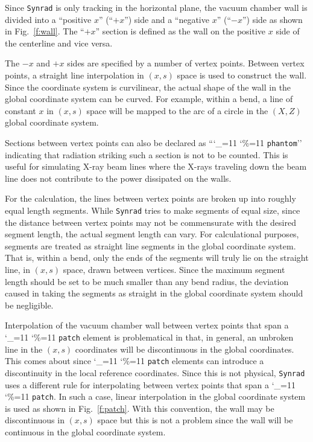 \documentclass[11pt]{article}
\newcommand{\syn}{\texttt{Synrad}\xspace}
\newcommand\ttcmd{\begingroup\catcode`\_=11 \catcode`\%=11 \dottcmd}
\newcommand\dottcmd[1]{\texttt{#1}\endgroup}
\newcommand{\vn}{\ttcmd}
\begin{document}
Since \syn is only tracking in the horizontal plane, the vacuum
chamber wall is divided into a ``positive $x$'' (``$+x$'') side and a
``negative $x$'' (``$-x$'') side as shown in Fig.~\ref{f:wall}. The
``$+x$'' section is defined as the wall on the positive $x$ side of
the centerline and vice versa. 

The $-x$ and $+x$ sides are specified by a number of vertex
points. Between vertex points, a straight line interpolation in $(x,
s)$ space is used to construct the wall. Since the coordinate system
is curvilinear, the actual shape of the wall in the global coordinate
system can be curved. For example, within a bend, a line of constant
$x$ in $(x, s)$ space will be mapped to the arc of a circle in the
$(X, Z)$ global coordinate system.

Sections between vertex points can also be declared as
``\vn{phantom}'' indicating that radiation striking such a section is
not to be counted. This is useful for simulating X-ray beam lines
where the X-rays traveling down the beam line does not contribute to
the power dissipated on the walls.

For the calculation, the lines between vertex points are broken up
into roughly equal length segments. While \syn tries to make
segments of equal size, since the distance between vertex points may
not be commensurate with the desired segment length, the actual
segment length can vary. For calculational purposes, segments are
treated as straight line segments in the global coordinate
system. That is, within a bend, only the ends of the segments will
truly lie on the straight line, in $(x, s)$ space, drawn between
vertices. Since the maximum segment length should be set to be much
smaller than any bend radius, the deviation caused in taking the
segments as straight in the global coordinate system should be
negligible.

Interpolation of the vacuum chamber wall between vertex points that
span a \vn{patch} element is problematical in that, in general, an
unbroken line in the $(x, s)$ coordinates will be discontinuous in the
global coordinates. This comes about since \vn{patch} elements can
introduce a discontinuity in the local reference coordinates. Since
this is not physical, \syn uses a different rule for interpolating
between vertex points that span a \vn{patch}. In such a case, linear
interpolation in the global coordinate system is used as shown in
Fig.~\ref{f:patch}. With this convention, the wall may be
discontinuous in $(x, s)$ space but this is not a problem since the
wall will be continuous in the global coordinate system.
\end{document}
